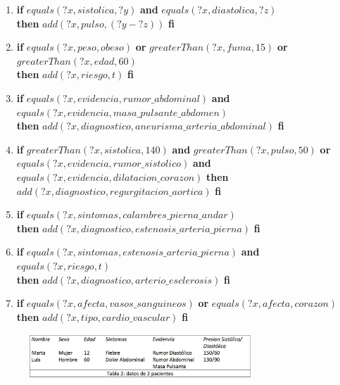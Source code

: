 \documentclass[10pt, a4paper,spanish]{article}
\begin{document}
		\begin{enumerate}[label={\textbf{R\theenumi:}}]

			\item
				\textbf{if} $equals(?x, sistolica, ?y)$ \textbf{and} $equals(?x, diastolica, ?z)$ \\
				\textbf{then} $add(?x, pulso, (?y - ?z) )$ \textbf{fi}

			\item
				\textbf{if} $equals(?x, peso, obeso)$ \textbf{or} $greaterThan(?x, fuma, 15)$ \textbf{or} $greaterThan(?x, edad, 60)$ \\
				\textbf{then} $add(?x, riesgo, t)$ \textbf{fi}

			\item
				\textbf{if} $equals(?x, evidencia, rumor\_abdominal)$ \textbf{and} $equals(?x, evidencia, masa\_pulsante\_abdomen)$ \\
				\textbf{then} $add(?x, diagnostico, aneurisma\_arteria\_abdominal)$ \textbf{fi}

			\item
				\textbf{if} $greaterThan(?x, sistolica, 140)$ \textbf{and} $greaterThan(?x, pulso, 50)$ \textbf{or} \\
				\hspace*{0.5cm} $equals(?x, evidencia, rumor\_sistolico)$ \textbf{and} $equals(?x, evidencia, dilatacion\_corazon)$
				\textbf{then} $add(?x, diagnostico, regurgitacion\_aortica)$ \textbf{fi}

			\item
				\textbf{if} $equals(?x, sintomas, calambres\_pierna\_andar)$ \\
				\textbf{then} $add(?x, diagnostico, estenosis\_arteria\_pierna)$ \textbf{fi}

			\item
				\textbf{if} $equals(?x, sintomas, estenosis\_arteria\_pierna)$ \textbf{and} $equals(?x, riesgo, t)$ \\
				\textbf{then} $add(?x, diagnostico, arterio\_esclerosis)$ \textbf{fi}

			\item
				\textbf{if} $equals(?x, afecta, vasos\_sanguineos)$ \textbf{or} $equals(?x, afecta, corazon)$ \\
				\textbf{then} $add(?x, tipo, cardio\_vascular)$ \textbf{fi}

		\end{enumerate}


		\begin{figure}[H]
			\begin{center}
				\includegraphics[width=0.75\textwidth]{table-2}
			\end{center}
		\end{figure}
\end{document}
